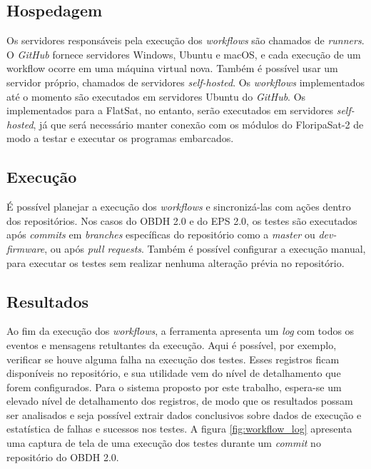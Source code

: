     \subsection{Hospedagem}
    Os servidores responsáveis pela execução dos \textit{workflows} são chamados de \textit{runners}. O \textit{GitHub} fornece servidores Windows, Ubuntu e macOS, e cada execução de um workflow ocorre em uma máquina virtual nova. Também é possível usar um servidor próprio, chamados de servidores \textit{self-hosted}. Os \textit{workflows} implementados até o momento são executados em servidores Ubuntu do \textit{GitHub}. Os implementados para a FlatSat, no entanto, serão executados em servidores \textit{self-hosted}, já que será necessário manter conexão com os módulos do FloripaSat-2 de modo a testar e executar os programas embarcados.

    \subsection{Execução}
    É possível planejar a execução dos \textit{workflows} e sincronizá-las com ações dentro dos repositórios. Nos casos do OBDH 2.0 e do EPS 2.0, os testes são executados após \textit{commits} em \textit{branches} específicas do repositório como a \textit{master} ou \textit{dev-firmware}, ou após \textit{pull requests}. Também é possível configurar a execução manual, para executar os testes sem realizar nenhuma alteração prévia no repositório.

    \subsection{Resultados}
    Ao fim da execução dos \textit{workflows}, a ferramenta apresenta um \textit{log} com todos os eventos e mensagens retultantes da execução. Aqui é possível, por exemplo, verificar se houve alguma falha na execução dos testes. Esses registros ficam disponíveis no repositório, e sua utilidade vem do nível de detalhamento que forem configurados. Para o sistema proposto por este trabalho, espera-se um elevado nível de detalhamento dos registros, de modo que os resultados possam ser analisados e seja possível extrair dados conclusivos sobre dados de execução e estatística de falhas e sucessos nos testes. A figura \ref{fig:workflow_log} apresenta uma captura de tela de uma execução dos testes durante um \textit{commit} no repositório do OBDH 2.0.

